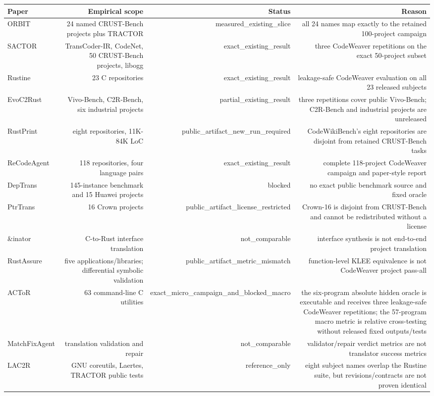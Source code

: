 \documentclass{article}
\begin{document}
\begin{tabular}{lrrr}
\toprule
Paper & Empirical scope & Status & Reason \\
\midrule
ORBIT & 24 named CRUST-Bench projects plus TRACTOR & measured\_existing\_slice & all 24 names map exactly to the retained 100-project campaign \\
SACTOR & TransCoder-IR, CodeNet, 50 CRUST-Bench projects, libogg & exact\_existing\_result & three CodeWeaver repetitions on the exact 50-project subset \\
Rustine & 23 C repositories & exact\_existing\_result & leakage-safe CodeWeaver evaluation on all 23 released subjects \\
EvoC2Rust & Vivo-Bench, C2R-Bench, six industrial projects & partial\_existing\_result & three repetitions cover public Vivo-Bench; C2R-Bench and industrial projects are unreleased \\
RustPrint & eight repositories, 11K-84K LoC & public\_artifact\_new\_run\_required & CodeWikiBench's eight repositories are disjoint from retained CRUST-Bench tasks \\
ReCodeAgent & 118 repositories, four language pairs & exact\_existing\_result & complete 118-project CodeWeaver campaign and paper-style report \\
DepTrans & 145-instance benchmark and 15 Huawei projects & blocked & no exact public benchmark source and fixed oracle \\
PtrTrans & 16 Crown projects & public\_artifact\_license\_restricted & Crown-16 is disjoint from CRUST-Bench and cannot be redistributed without a license \\
\&inator & C-to-Rust interface translation & not\_comparable & interface synthesis is not end-to-end project translation \\
RustAssure & five applications/libraries; differential symbolic validation & public\_artifact\_metric\_mismatch & function-level KLEE equivalence is not CodeWeaver project pass-all \\
ACToR & 63 command-line C utilities & exact\_micro\_campaign\_and\_blocked\_macro & the six-program absolute hidden oracle is executable and receives three leakage-safe CodeWeaver repetitions; the 57-program macro metric is relative cross-testing without released fixed outputs/tests \\
MatchFixAgent & translation validation and repair & not\_comparable & validator/repair verdict metrics are not translator success metrics \\
LAC2R & GNU coreutils, Laertes, TRACTOR public tests & reference\_only & eight subject names overlap the Rustine suite, but revisions/contracts are not proven identical \\

\end{tabular}
\end{document}
